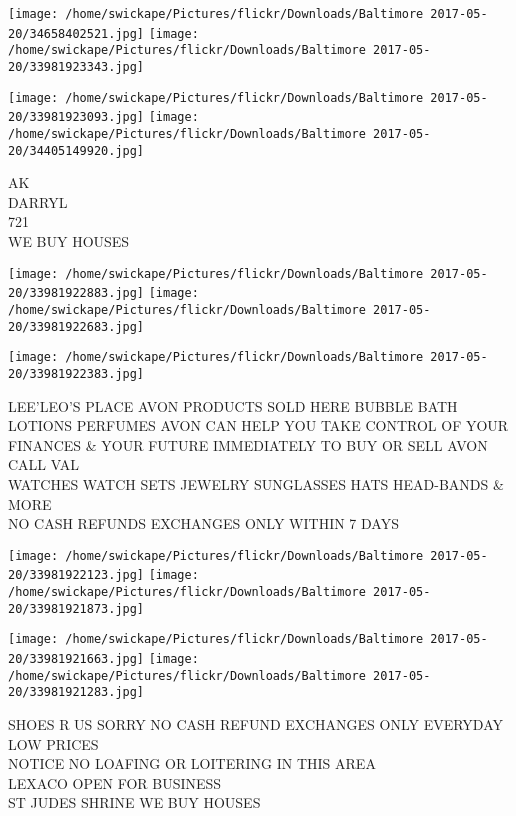 \documentclass[10pt,letterpaper]{article}
\begin{document}
\texttt{[image: /home/swickape/Pictures/flickr/Downloads/Baltimore 2017-05-20/34658402521.jpg]}
\texttt{[image: /home/swickape/Pictures/flickr/Downloads/Baltimore 2017-05-20/33981923343.jpg]}

\texttt{[image: /home/swickape/Pictures/flickr/Downloads/Baltimore 2017-05-20/33981923093.jpg]}
\texttt{[image: /home/swickape/Pictures/flickr/Downloads/Baltimore 2017-05-20/34405149920.jpg]}

AK\\
DARRYL\\
721\\
WE BUY HOUSES\\
\pagebreak

\texttt{[image: /home/swickape/Pictures/flickr/Downloads/Baltimore 2017-05-20/33981922883.jpg]}
\texttt{[image: /home/swickape/Pictures/flickr/Downloads/Baltimore 2017-05-20/33981922683.jpg]}

\vspace{0.25in}
\texttt{[image: /home/swickape/Pictures/flickr/Downloads/Baltimore 2017-05-20/33981922383.jpg]}

LEE'LEO'S PLACE AVON PRODUCTS SOLD HERE BUBBLE BATH LOTIONS PERFUMES AVON CAN HELP YOU TAKE CONTROL OF YOUR FINANCES \& YOUR FUTURE IMMEDIATELY TO BUY OR SELL AVON CALL VAL\\
WATCHES WATCH SETS JEWELRY SUNGLASSES HATS HEAD{-}BANDS \& MORE\\
NO CASH REFUNDS EXCHANGES ONLY WITHIN 7 DAYS\\
\pagebreak

\texttt{[image: /home/swickape/Pictures/flickr/Downloads/Baltimore 2017-05-20/33981922123.jpg]}
\texttt{[image: /home/swickape/Pictures/flickr/Downloads/Baltimore 2017-05-20/33981921873.jpg]}

\texttt{[image: /home/swickape/Pictures/flickr/Downloads/Baltimore 2017-05-20/33981921663.jpg]}
\texttt{[image: /home/swickape/Pictures/flickr/Downloads/Baltimore 2017-05-20/33981921283.jpg]}

SHOES R US SORRY NO CASH REFUND EXCHANGES ONLY EVERYDAY LOW PRICES\\
NOTICE NO LOAFING OR LOITERING IN THIS AREA\\
LEXACO OPEN FOR BUSINESS\\
ST JUDES SHRINE WE BUY HOUSES\\
\pagebreak
\end{document}
